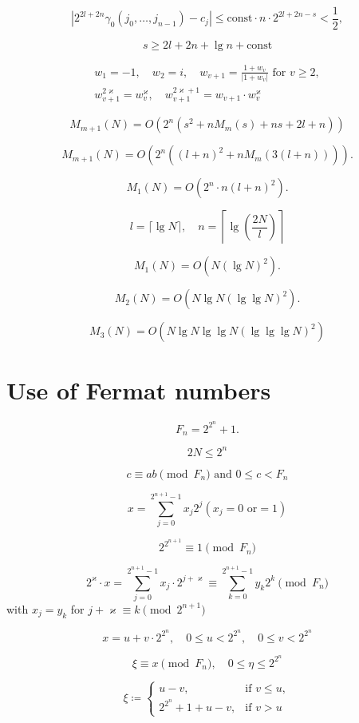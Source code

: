 \documentclass{article}
\begin{document}
\[
\left|2^{2l + 2n} \gamma_0 (j_0, \ldots, j_{n - 1}) - c_j\right| \le \text{const} \cdot n \cdot 2^{2l + 2n - s} < \frac{1}{2},
\]

\[
\tag{3.9}
s \ge 2l + 2n + \lg n + \text{const}
\]

\[
\begin{gathered}
w_1 = -1, \quad w_2 = i, \quad w_{v + 1} = \frac{1 + w_v}{|1 + w_v|}\text{ for }v \ge 2,\\
w_{v + 1}^{2 \varkappa} = w_v^\varkappa, \quad w_{v + 1}^{2\varkappa + 1} = w_{v + 1} \cdot w_v^\varkappa
\end{gathered}
\]

\[
M_{m + 1}(N) = O(2^n (s^2 + n M_m(s) + ns + 2l + n))
\]

\[
\tag{3.10}
M_{m + 1}(N) = O(2^n((l + n)^2 + nM_m(3(l + n)))).
\]

\[
M_1(N) = O(2^n \cdot n(l + n)^2).
\]

\[
l = \lceil \lg N \rceil, \quad n = \left\lceil \lg\left(\frac{2N}{l}\right)\right\rceil
\]

\[
\tag{3.11}
M_1(N) = O(N (\lg N)^2).
\]

\[
M_2(N) = O(N \lg N (\lg \lg N)^2).
\]

\[
M_3(N) = O(N \lg N \lg \lg N (\lg \lg \lg N)^2)
\]

\section{Use of Fermat numbers}
\[
F_n = 2^{2^n} + 1.
\]

\[
\tag{4.1}
2N \le 2^n
\]

\[
\tag{4.2}
c \equiv ab \pmod{F_n}\text{ and }0 \le c < F_n
\]

\[
\tag{4.3}
x = \sum_{j = 0}^{2^{n + 1} - 1} x_j 2^j (x_j = 0\text{ or}= 1)
\]

\[
\tag{4.4}
2^{2^{n + 1}} \equiv 1 \pmod{F_n}
\]

\[
2^\varkappa \cdot x = \sum_{j = 0}^{2^{n + 1} - 1} x_j \cdot 2^{j + \varkappa} \equiv \sum_{k = 0}^{2^{n + 1} - 1} y _k 2^k \pmod{F_n}
\] with $x_j = y_k$ for $j + \varkappa \equiv k \pmod {2^{n + 1}}$

\[
\tag{4.5}
x = u + v \cdot 2^{2^n}, \quad 0 \le u < 2^{2^n}, \quad 0 \le v < 2^{2^n}
\]

\[
\xi \equiv x \pmod{F_n}, \quad 0 \le \eta \le 2^{2^n}
\]

\[
\tag{4.6}
\xi \coloneq
\begin{cases}
u - v, & \text{if }v \le u,\\
2^{2^n} + 1 + u - v, & \text{if }v > u
\end{cases}
\]
\end{document}
